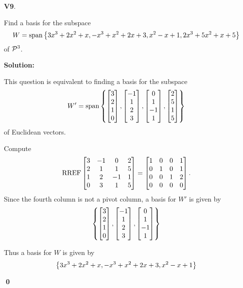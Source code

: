 \documentclass{article}
\newenvironment{problem}[1]
{
  \begin{flushleft}
  \textbf{#1}.
  \ignorespaces
}
{
  \end{flushleft}
}
\newenvironment{solution}
{
  \ignorespaces
  \textbf{Solution:}
}
{
  \ignorespacesafterend
  \begin{flushright}
  {\bfseries \qed}
  \end{flushright}
}
\begin{document}
\begin{problem}{V9}
Find a basis for the subspace
\[W=\vspan\setList{3x^3+2x^2+x,-x^3+x^2+2x+3,x^2-x+1,2x^3+5x^2+x+5}\]
of \(\P^3\).
\end{problem}
\begin{solution}
This question is equivalent to finding a basis for the subspace
\[
  W' = \vspan \setList{
  \begin{bmatrix} 3\\2\\1\\0\end{bmatrix},
  \begin{bmatrix} -1\\1\\2\\3\end{bmatrix},
  \begin{bmatrix} 0\\1\\-1\\1\end{bmatrix},
  \begin{bmatrix} 2\\5\\1\\5\end{bmatrix}
  }
\]
of Euclidean vectors.

Compute
\[\RREF \begin{bmatrix} 3 & -1 & 0 & 2 \\ 2 & 1 & 1 & 5 \\ 1 & 2 & -1 & 1 \\ 0 & 3 & 1 & 5 \end{bmatrix} =
\begin{bmatrix} 1 & 0 & 0 & 1 \\ 0 & 1 & 0 & 1 \\ 0 & 0 & 1 & 2 \\ 0 & 0 & 0 & 0 \end{bmatrix}.\]
Since the fourth column is not a pivot column, a basis for \(W'\) is given by
\[
  \setList{
  \begin{bmatrix} 3\\2\\1\\0\end{bmatrix},
  \begin{bmatrix} -1\\1\\2\\3\end{bmatrix},
  \begin{bmatrix} 0\\1\\-1\\1\end{bmatrix}
  }
\]

Thus a basis for \(W\) is given by
\[
  \setList{3x^3+2x^2+x,-x^3+x^2+2x+3,x^2-x+1}
\]
\end{solution}
\end{document}
